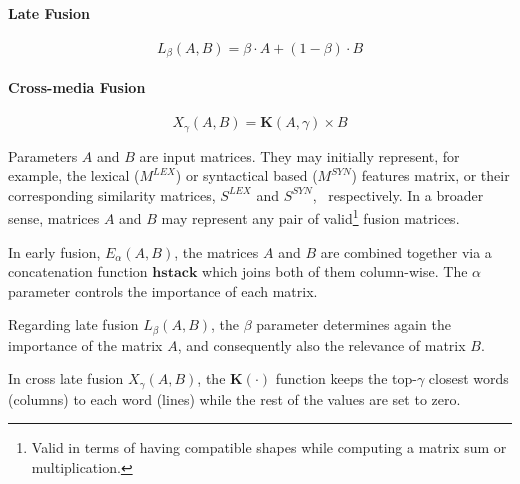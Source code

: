 \documentclass[11pt]{article}
\begin{document}
\paragraph{Late Fusion}
\begin{equation}
L_\beta(A,B) = \beta \cdot A + (1 - \beta)\cdot B
\end{equation}
\paragraph{Cross-media Fusion}
\begin{equation}
X_{\gamma}(A,B) = \mathbf{K}(A,\gamma) \times B
\end{equation}


Parameters $A$ and $B$ are input matrices. They may initially represent, for example,  the lexical ($M^{LEX}$) or syntactical based ($M^{SYN}$) features matrix, or their  corresponding similarity matrices, $S^{LEX}$ and  $S^{SYN}$, ~respectively. In a broader sense, matrices $A$ and $B$ may represent any pair of valid\footnote{Valid in terms of having compatible shapes while computing a matrix sum or multiplication.} fusion matrices. 

In early fusion, $E_\alpha(A,B)$, the matrices $A$ and $B$ are combined together via a concatenation function $\mathbf{hstack}$ which joins both of them column-wise. The $\alpha$ parameter controls the importance of each matrix.

Regarding late fusion $L_\beta(A,B)$, the  $\beta$ parameter determines again the importance of the  matrix $A$,  and consequently also the relevance of matrix $B$.

In cross late fusion $X_\gamma(A,B)$, the $\mathbf{K}(\cdot)$ function keeps the top-$\gamma$ closest words (columns) to each word (lines) while the rest of the values are set to zero.
\end{document}
